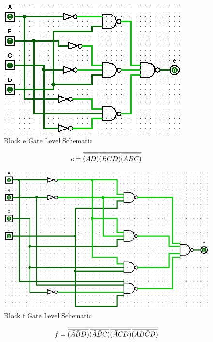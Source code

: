 \documentclass[12pt]{article}
\newcommand{\overbar}[1]{\mkern 1.5mu\overline{\mkern-1.5mu#1\mkern-1.5mu}\mkern 1.5mu} %
\begin{document}
\begin{figure}[h]
	\centering
	\label{fig:eBlockGates}
	\includegraphics[width=0.65\linewidth, keepaspectratio]{e_logicCkt}
	\caption{Block e Gate Level Schematic}
\end{figure}

\begin{equation}
	e = \overline{\overbar{(\bar{A}D)}\overbar{(\bar{B}\bar{C}D)}\overbar{(\bar{A}B\bar{C})}}
\end{equation}

\begin{figure}[h]
	\centering
	\label{fig:fBlockGates}
	\includegraphics[width=0.65\linewidth, keepaspectratio]{f_logicCkt}
	\caption{Block f Gate Level Schematic}
\end{figure}

\begin{equation}
	f = \overline{\overbar{(\bar{A}\bar{B}D)}\overbar{(\bar{A}\bar{B}C)}\overbar{(\bar{A}CD)}\overbar{(AB\bar{C}D)}}
\end{equation}
\end{document}
